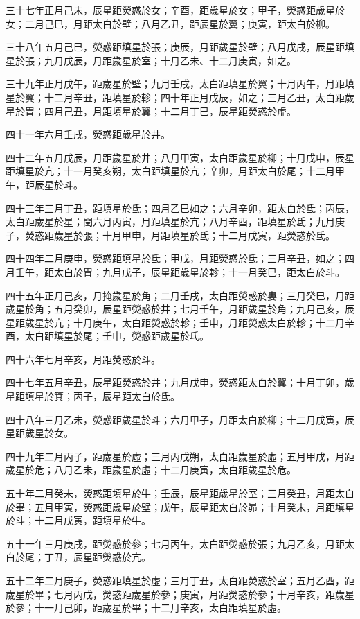 \begin{pinyinscope}
三十七年正月己未，辰星距熒惑於女；辛酉，距歲星於女；甲子，熒惑距歲星於女；二月己巳，月距太白於壁；八月乙丑，距辰星於翼；庚寅，距太白於柳。

三十八年五月己巳，熒惑距填星於張；庚辰，月距歲星於壁；八月戊戌，辰星距填星於張；九月戊辰，月距歲星於室；十月乙未、十二月庚寅，如之。

三十九年正月戊午，距歲星於壁；九月壬戌，太白距填星於翼；十月丙午，月距填星於翼；十二月辛丑，距填星於軫；四十年正月戊辰，如之；三月乙丑，太白距歲星於胃；四月己丑，月距填星於翼；十二月丁巳，辰星距熒惑於虛。

四十一年六月壬戌，熒惑距歲星於井。

四十二年五月戊辰，月距歲星於井；八月甲寅，太白距歲星於柳；十月戊申，辰星距填星於亢；十一月癸亥朔，太白距填星於亢；辛卯，月距太白於尾；十二月甲午，距辰星於斗。

四十三年三月丁丑，距填星於氐；四月乙巳如之；六月辛卯，距太白於氐；丙辰，太白距歲星於星；閏六月丙寅，月距填星於亢；八月辛酉，距填星於氐；九月庚子，熒惑距歲星於張；十月甲申，月距填星於氐；十二月戊寅，距熒惑於氐。

四十四年二月庚申，熒惑距填星於氐；甲戌，月距熒惑於氐；三月辛丑，如之；四月壬午，距太白於胃；九月戊子，辰星距歲星於軫；十一月癸巳，距太白於斗。

四十五年正月己亥，月掩歲星於角；二月壬戌，太白距熒惑於婁；三月癸巳，月距歲星於角；五月癸卯，辰星距熒惑於井；七月壬午，月距歲星於角；九月己亥，辰星距歲星於亢；十月庚午，太白距熒惑於軫；壬申，月距熒惑太白於軫；十二月辛酉，太白距填星於尾；壬申，熒惑距歲星於氐。

四十六年七月辛亥，月距熒惑於斗。

四十七年五月辛丑，辰星距熒惑於井；九月戊申，熒惑距太白於翼；十月丁卯，歲星距填星於箕；丙子，辰星距太白於氐。

四十八年三月乙未，熒惑距歲星於斗；六月甲子，月距太白於柳；十二月戊寅，辰星距歲星於女。

四十九年二月丙子，距歲星於虛；三月丙戌朔，太白距歲星於虛；五月甲戌，月距歲星於危；八月乙未，距歲星於虛；十二月庚寅，太白距歲星於危。

五十年二月癸未，熒惑距填星於牛；壬辰，辰星距歲星於室；三月癸丑，月距太白於畢；五月甲寅，熒惑距歲星於壁；戊午，辰星距太白於昴；十月癸未，月距填星於斗；十二月戊寅，距填星於牛。

五十一年三月庚戌，距熒惑於參；七月丙午，太白距熒惑於張；九月乙亥，月距太白於尾；丁丑，辰星距熒惑於亢。

五十二年二月庚子，熒惑距填星於虛；三月丁丑，太白距熒惑於室；五月乙酉，距歲星於畢；七月丙戌，熒惑距歲星於參；庚寅，月距熒惑於參；十月辛亥，距歲星於參；十一月己卯，距歲星於畢；十二月辛亥，太白距填星於虛。


\end{pinyinscope}
